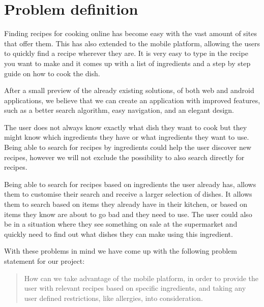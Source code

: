 \section{Problem definition}\label{sec:probdef}

Finding recipes for cooking online has become easy with the vast amount of sites that offer them. This has also extended to the mobile platform, allowing the users to quickly find a recipe wherever they are. It is very easy to type in the recipe you want to make and it comes up with a list of ingredients and a step by step guide on how to cook the dish.

After a small preview of the already existing solutions, of both web and android applications, we believe that we can create an application with improved features, such as a better search algorithm, easy navigation, and an elegant design. 

The user does not always know exactly what dish they want to cook but they might know which ingredients they have or what ingredients they want to use. Being able to search for recipes by ingredients could help the user discover new recipes, however we will not exclude the possibility to also search directly for recipes. 

Being able to search for recipes based on ingredients the user already has, allows them to customise their search and receive a larger selection of dishes. It allows them to search based on items they already have in their kitchen, or based on items they know are about to go bad and they need to use. The user could also be in a situation where they see something on sale at the supermarket and quickly need to find out what dishes they can make using this ingredient.

With these problems in mind we have come up with the following problem statement for our project:

\begin{quote}
How can we take advantage of the mobile platform, in order to provide the user with relevant recipes based on specific ingredients, and taking any user defined restrictions, like allergies, into consideration.
\end{quote}